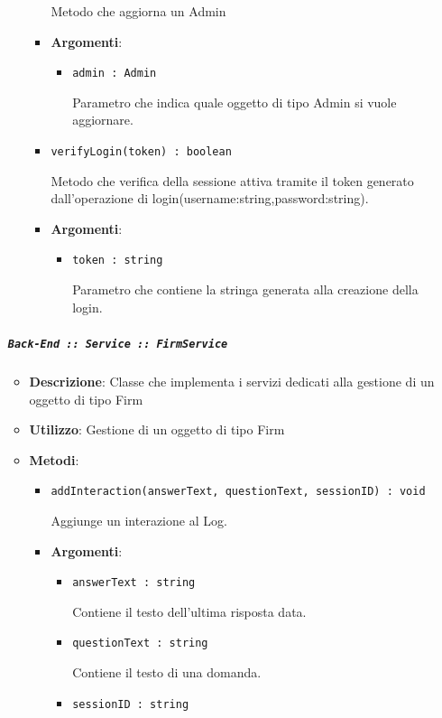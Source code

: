 \documentclass[../DefinizioneDiProdotto.tex]{subfiles}
\begin{document}
\begin{itemize}
\begin{itemize}
\begin{itemize}
	 Metodo che aggiorna un Admin

	\item \textbf{Argomenti}:
	\begin{itemize}
	\item \texttt{admin : Admin}\

	 Parametro che indica quale oggetto di tipo Admin si vuole aggiornare.
	\end{itemize}
	\end{itemize}\vspace{0.5em}
	\begin{itemize}
	\item \texttt{verifyLogin(token) : boolean}\

	 Metodo che verifica della sessione attiva tramite il token generato dall'operazione di login(username:string,password:string).

	\item \textbf{Argomenti}:
	\begin{itemize}
	\item \texttt{token : string}\

	 Parametro che contiene la stringa generata alla creazione della login.
	\end{itemize}
	\end{itemize}\vspace{0.5em}
	\end{itemize}\subparagraph{\texttt{Back-End :: Service :: FirmService}}
	\begin{itemize}\item \textbf{Descrizione}: Classe che implementa i servizi dedicati alla gestione di un oggetto di tipo Firm
	\item \textbf{Utilizzo}: Gestione di un oggetto di tipo Firm
	\item \textbf{Metodi}:
	\begin{itemize}
	\item \texttt{addInteraction(answerText, questionText, sessionID) : void}\

	 Aggiunge un interazione al Log.

	\item \textbf{Argomenti}:
	\begin{itemize}
	\item \texttt{answerText : string}\

	 Contiene il testo dell'ultima risposta data.
	\item \texttt{questionText : string}\

	 Contiene il testo di una domanda.
	\item \texttt{sessionID : string}\


\end{itemize}
\end{itemize}
\end{itemize}
\end{itemize}
\end{document}
